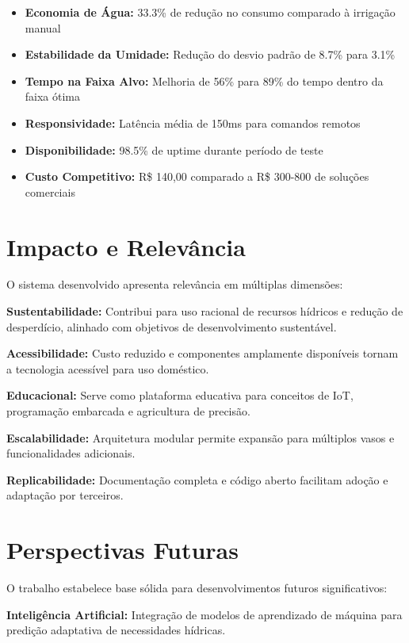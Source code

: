 \begin{itemize}
    \item \textbf{Economia de Água:} 33.3\% de redução no consumo comparado à irrigação manual
    \item \textbf{Estabilidade da Umidade:} Redução do desvio padrão de 8.7\% para 3.1\%
    \item \textbf{Tempo na Faixa Alvo:} Melhoria de 56\% para 89\% do tempo dentro da faixa ótima
    \item \textbf{Responsividade:} Latência média de 150ms para comandos remotos
    \item \textbf{Disponibilidade:} 98.5\% de uptime durante período de teste
    \item \textbf{Custo Competitivo:} R\$ 140,00 comparado a R\$ 300-800 de soluções comerciais
\end{itemize}

\section{Impacto e Relevância}

O sistema desenvolvido apresenta relevância em múltiplas dimensões:

\textbf{Sustentabilidade:} Contribui para uso racional de recursos hídricos e redução de desperdício, alinhado com objetivos de desenvolvimento sustentável.

\textbf{Acessibilidade:} Custo reduzido e componentes amplamente disponíveis tornam a tecnologia acessível para uso doméstico.

\textbf{Educacional:} Serve como plataforma educativa para conceitos de IoT, programação embarcada e agricultura de precisão.

\textbf{Escalabilidade:} Arquitetura modular permite expansão para múltiplos vasos e funcionalidades adicionais.

\textbf{Replicabilidade:} Documentação completa e código aberto facilitam adoção e adaptação por terceiros.

\section{Perspectivas Futuras}

O trabalho estabelece base sólida para desenvolvimentos futuros significativos:

\textbf{Inteligência Artificial:} Integração de modelos de aprendizado de máquina para predição adaptativa de necessidades hídricas.

